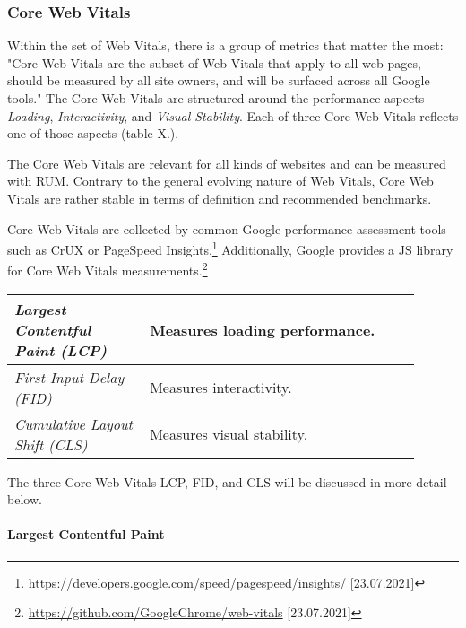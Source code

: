 

\subsubsection{Core Web Vitals}

Within the set of Web Vitals, there is a group of metrics that matter the most:
"Core Web Vitals are the subset of Web Vitals that apply to all web pages, should be measured by all site owners, and will be surfaced across all Google tools." %
The Core Web Vitals are structured around the performance aspects \textit{Loading}, \textit{Interactivity}, and \textit{Visual Stability}.
Each of three Core Web Vitals reflects one of those aspects (table X.).

The Core Web Vitals are relevant for all kinds of websites and can be measured with RUM.
Contrary to the general evolving nature of Web Vitals, Core Web Vitals are rather stable in terms of definition and recommended benchmarks.

Core Web Vitals are collected by common Google performance assessment tools such as CrUX or PageSpeed Insights.\footnote{\url{https://developers.google.com/speed/pagespeed/insights/} [23.07.2021]}
Additionally, Google provides a JS library for Core Web Vitals measurements.\footnote{\url{https://github.com/GoogleChrome/web-vitals} [23.07.2021]}


\begin{center}
\small
	\begin{tabular}{  p{0.3\linewidth} | p{0.6\linewidth}  }
	\textit{Largest Contentful Paint (LCP)} & Measures loading performance.  \\
	\hline
	\textit{First Input Delay (FID)} & Measures interactivity. \\
	\hline
	\textit{Cumulative Layout Shift (CLS)} & Measures visual stability.  \\
	\end{tabular}
\end{center}

The three Core Web Vitals LCP, FID, and CLS will be discussed in more detail below.





\paragraph{Largest Contentful Paint}


